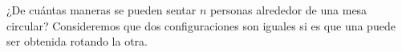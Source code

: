 \begin{statement}{8}
  ¿De cu\'antas maneras se pueden sentar $n$ personas alrededor de una mesa circular?
  Consideremos que dos configuraciones son iguales si es que una puede ser obtenida rotando la otra.
\end{statement}